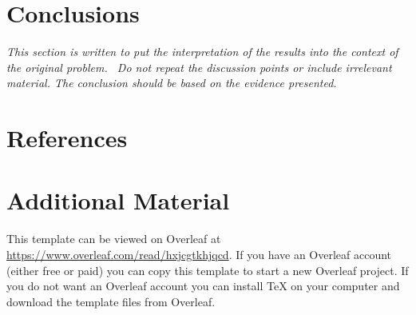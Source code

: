 \documentclass[11pt,a4paper,oneside]{report}
\newcommand{\instructions}[1]{{\color{black}\itshape #1}}
\begin{document}

\chapter{Conclusions}
\label{conclusions}

\instructions{This section is written to put the interpretation of the results
into the context of the original problem.~ Do not repeat the discussion
points or include irrelevant material. The conclusion should be based on
the evidence presented.}


\chapter*{References}
\label{references}



\printbibliography[heading=none]



\appendix

\chapter{Additional Material}
\label{appendix-a}

This template can be viewed on Overleaf at \url{https://www.overleaf.com/read/hxjcgtkhjqcd}.
If you have an Overleaf account (either free or paid) you can copy this template to start a new Overleaf project.
If you do not want an Overleaf account you can install TeX on your computer and download the template files from Overleaf.
\end{document}
